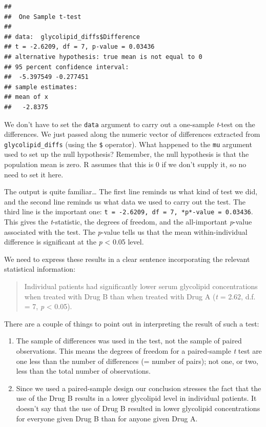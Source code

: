 \documentclass[
]{book}
\begin{document}
\begin{verbatim}
## 
##  One Sample t-test
## 
## data:  glycolipid_diffs$Difference
## t = -2.6209, df = 7, p-value = 0.03436
## alternative hypothesis: true mean is not equal to 0
## 95 percent confidence interval:
##  -5.397549 -0.277451
## sample estimates:
## mean of x 
##   -2.8375
\end{verbatim}

We don't have to set the \texttt{data} argument to carry out a one-sample \emph{t}-test on the differences. We just passed along the numeric vector of differences extracted from \texttt{glycolipid\_diffs} (using the \texttt{\$} operator). What happened to the \texttt{mu} argument used to set up the null hypothesis? Remember, the null hypothesis is that the population mean is zero. R assumes that this is 0 if we don't supply it, so no need to set it here.

The output is quite familiar\ldots{} The first line reminds us what kind of test we did, and the second line reminds us what data we used to carry out the test. The third line is the important one: \texttt{t\ =\ -2.6209,\ df\ =\ 7,\ *p*-value\ =\ 0.03436}. This gives the \emph{t}-statistic, the degrees of freedom, and the all-important \emph{p}-value associated with the test. The \emph{p}-value tells us that the mean within-individual difference is significant at the \emph{p} \textless{} 0.05 level.

We need to express these results in a clear sentence incorporating the relevant statistical information:

\begin{quote}
Individual patients had significantly lower serum glycolipid concentrations when treated with Drug B than when treated with Drug A (\emph{t} = 2.62, d.f. = 7, \emph{p} \textless{} 0.05).
\end{quote}

There are a couple of things to point out in interpreting the result of such a test:

\begin{enumerate}
\def\labelenumi{\arabic{enumi}.}
\item
  The sample of differences was used in the test, not the sample of paired observations. This means the degrees of freedom for a paired-sample \emph{t} test are one less than the number of differences (= number of pairs); not one, or two, less than the total number of observations.
\item
  Since we used a paired-sample design our conclusion stresses the fact that the use of the Drug B results in a lower glycolipid level in individual patients. It doesn't say that the use of Drug B resulted in lower glycolipid concentrations for everyone given Drug B than for anyone given Drug A.
\end{enumerate}
\end{document}
